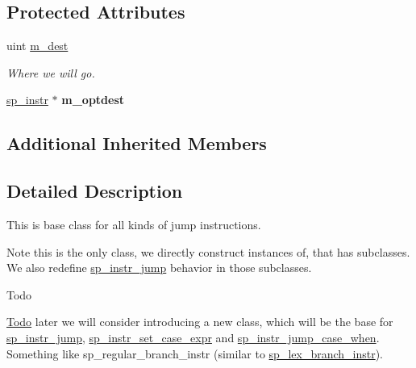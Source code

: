 \subsection*{Protected Attributes}
\begin{DoxyCompactItemize}
\item 
\mbox{\label{classsp__instr__jump_a6d6eb2bcf4fddac8436bbb02c2f60e3a}} 
uint \mbox{\hyperlink{classsp__instr__jump_a6d6eb2bcf4fddac8436bbb02c2f60e3a}{m\+\_\+dest}}
\begin{DoxyCompactList}\small\item\em Where we will go. \end{DoxyCompactList}\item 
\mbox{\label{classsp__instr__jump_a5cab6f8e6b3783018314d2a2f725cfd8}} 
\mbox{\hyperlink{classsp__instr}{sp\+\_\+instr}} $\ast$ {\bfseries m\+\_\+optdest}
\end{DoxyCompactItemize}
\subsection*{Additional Inherited Members}


\subsection{Detailed Description}
This is base class for all kinds of jump instructions.

\begin{DoxyNote}{Note}
this is the only class, we directly construct instances of, that has subclasses. We also redefine \mbox{\hyperlink{classsp__instr__jump}{sp\+\_\+instr\+\_\+jump}} behavior in those subclasses.
\end{DoxyNote}
\begin{DoxyRefDesc}{Todo}
\item[\mbox{\hyperlink{todo__todo000073}{Todo}}]later we will consider introducing a new class, which will be the base for \mbox{\hyperlink{classsp__instr__jump}{sp\+\_\+instr\+\_\+jump}}, \mbox{\hyperlink{classsp__instr__set__case__expr}{sp\+\_\+instr\+\_\+set\+\_\+case\+\_\+expr}} and \mbox{\hyperlink{classsp__instr__jump__case__when}{sp\+\_\+instr\+\_\+jump\+\_\+case\+\_\+when}}. Something like sp\+\_\+regular\+\_\+branch\+\_\+instr (similar to \mbox{\hyperlink{classsp__lex__branch__instr}{sp\+\_\+lex\+\_\+branch\+\_\+instr}}). \end{DoxyRefDesc}


